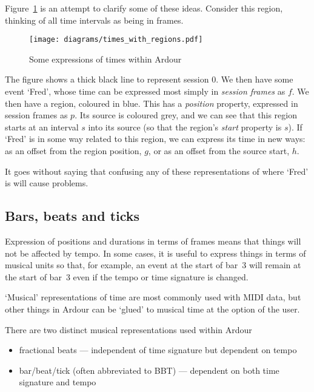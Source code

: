 \documentclass[10pt,a4paper]{book}
\begin{document}
Figure~\ref{fig:times-with-regions} is an attempt to clarify some of
these ideas.  Consider this region, thinking of all time intervals as
being in frames.

\begin{figure}[ht]
\begin{center}
\texttt{[image: diagrams/times\_with\_regions.pdf]}
\end{center}
\caption{Some expressions of times within Ardour}
\label{fig:times-with-regions}
\end{figure}

The figure shows a thick black line to represent session $0$.  We then
have some event `Fred', whose time can be expressed most simply in
\emph{session frames} as $f$.  We then have a region, coloured in
blue.  This has a \emph{position} property, expressed in session
frames as $p$.  Its source is coloured grey, and we can see that this
region starts at an interval $s$ into its source (so that the region's
\emph{start} property is $s$).  If `Fred' is in some way related to
  this region, we can express its time in new ways: as an offset from
  the region position, $g$, or as an offset from the source start,
  $h$.

It goes without saying that confusing any of these representations of
where `Fred' is will cause problems.


\subsection{Bars, beats and ticks}

Expression of positions and durations in terms of frames means that
things will not be affected by tempo.  In some cases, it is useful to
express things in terms of musical units so that, for example, an
event at the start of bar~3 will remain at the start of bar~3 even if
the tempo or time signature is changed.

`Musical' representations of time are most commonly used with MIDI
data, but other things in Ardour can be `glued' to musical time at the
option of the user.

There are two distinct musical representations used within Ardour
\begin{itemize}
\item fractional beats --- independent of time signature but dependent on tempo
\item bar/beat/tick (often abbreviated to BBT) --- dependent on both time signature and tempo
\end{itemize}
\end{document}
